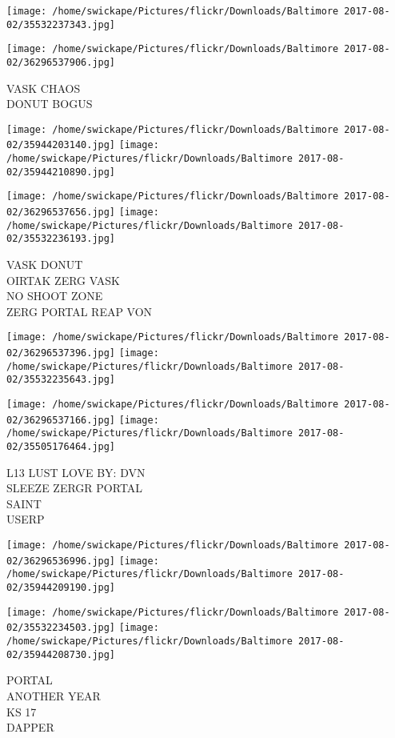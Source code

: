\documentclass[10pt,letterpaper]{article}
\begin{document}
\texttt{[image: /home/swickape/Pictures/flickr/Downloads/Baltimore 2017-08-02/35532237343.jpg]}

\vspace{0.25in}
\texttt{[image: /home/swickape/Pictures/flickr/Downloads/Baltimore 2017-08-02/36296537906.jpg]}

VASK CHAOS\\
DONUT BOGUS
\pagebreak

\texttt{[image: /home/swickape/Pictures/flickr/Downloads/Baltimore 2017-08-02/35944203140.jpg]}
\texttt{[image: /home/swickape/Pictures/flickr/Downloads/Baltimore 2017-08-02/35944210890.jpg]}

\texttt{[image: /home/swickape/Pictures/flickr/Downloads/Baltimore 2017-08-02/36296537656.jpg]}
\texttt{[image: /home/swickape/Pictures/flickr/Downloads/Baltimore 2017-08-02/35532236193.jpg]}

VASK DONUT\\
OIRTAK ZERG VASK\\
NO SHOOT ZONE\\
ZERG PORTAL REAP VON
\pagebreak

\texttt{[image: /home/swickape/Pictures/flickr/Downloads/Baltimore 2017-08-02/36296537396.jpg]}
\texttt{[image: /home/swickape/Pictures/flickr/Downloads/Baltimore 2017-08-02/35532235643.jpg]}

\texttt{[image: /home/swickape/Pictures/flickr/Downloads/Baltimore 2017-08-02/36296537166.jpg]}
\texttt{[image: /home/swickape/Pictures/flickr/Downloads/Baltimore 2017-08-02/35505176464.jpg]}

L13 LUST LOVE BY: DVN\\
SLEEZE ZERGR PORTAL\\
SAINT\\
USERP
\pagebreak

\texttt{[image: /home/swickape/Pictures/flickr/Downloads/Baltimore 2017-08-02/36296536996.jpg]}
\texttt{[image: /home/swickape/Pictures/flickr/Downloads/Baltimore 2017-08-02/35944209190.jpg]}

\texttt{[image: /home/swickape/Pictures/flickr/Downloads/Baltimore 2017-08-02/35532234503.jpg]}
\texttt{[image: /home/swickape/Pictures/flickr/Downloads/Baltimore 2017-08-02/35944208730.jpg]}

PORTAL\\
ANOTHER YEAR\\
KS 17\\
DAPPER
\pagebreak
\end{document}
